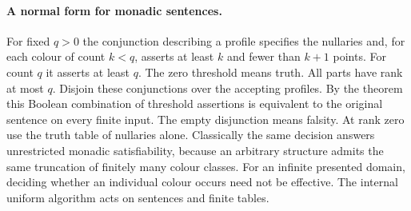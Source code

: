 \paragraph{A normal form for monadic sentences.}
For fixed $q>0$ the conjunction describing a profile specifies the nullaries and, for each colour of count $k<q$, asserts at least $k$ and fewer than $k+1$ points. For count $q$ it asserts at least $q$. The zero threshold means truth. All parts have rank at most $q$. Disjoin these conjunctions over the accepting profiles. By the theorem this Boolean combination of threshold assertions is equivalent to the original sentence on every finite input. The empty disjunction means falsity. At rank zero use the truth table of nullaries alone. Classically the same decision answers unrestricted monadic satisfiability, because an arbitrary structure admits the same truncation of finitely many colour classes. For an infinite presented domain, deciding whether an individual colour occurs need not be effective. The internal uniform algorithm acts on sentences and finite tables.

